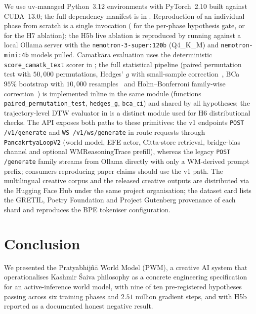 \documentclass[journal,onecolumn,11pt]{IEEEtran}
\begin{document}
We use uv-managed Python~3.12 environments with PyTorch~2.10 built against
CUDA~13.0; the full dependency manifest is in .
Reproduction of an individual phase from scratch is a single invocation
( for the per-phase hypothesis gate, or
 for the H7 ablation); the H5b live
ablation is reproduced by running  against a
local Ollama server with the \texttt{nemotron-3-super:120b} (Q4\_K\_M) and
\texttt{nemotron-mini:4b} models pulled.
Camatkāra evaluation uses the deterministic \texttt{score\_camatk\_text}
scorer in ; the full statistical pipeline
(paired permutation test with $50{,}000$ permutations, Hedges' $g$ with
small-sample correction~\cite{hedges1981distribution}, BCa $95\%$ bootstrap
with $10{,}000$ resamples~\cite{efron1987bootstrap} and Holm--Bonferroni
family-wise correction~\cite{holm1979simple}) is implemented inline in
the same module (functions \texttt{paired\_permutation\_test},
\texttt{hedges\_g}, \texttt{bca\_ci}) and shared by all hypotheses; the
trajectory-level DTW evaluator in  is a
distinct module used for H6 distributional checks.
The API exposes both paths to these primitives: the v1 endpoints
\texttt{POST /v1/generate} and \texttt{WS /v1/ws/generate} in
 route requests through \texttt{PancakrtyaLoopV2}
(world model, EFE actor, Citta-store retrieval, bridge-bias channel and
optional WMReasoningTrace prefill), whereas the legacy
\texttt{POST /generate} family streams from Ollama directly with only a
WM-derived prompt prefix; consumers reproducing paper claims should use
the v1 path.
The multilingual creative corpus and the released creative outputs are
distributed via the Hugging Face Hub under the same project organisation;
the dataset card lists the GRETIL, Poetry Foundation and Project Gutenberg
provenance of each shard and reproduces the BPE tokeniser configuration.

\section{Conclusion}\label{sec:conclusion}

We presented the Pratyabhijñā World Model (PWM), a creative AI system that
operationalises Kashmir Śaiva philosophy as a concrete engineering
specification for an active-inference world model, with nine of ten
pre-registered hypotheses passing across six training phases and $2.51$
million gradient steps, and with H5b reported as a documented honest
negative result.
\end{document}
